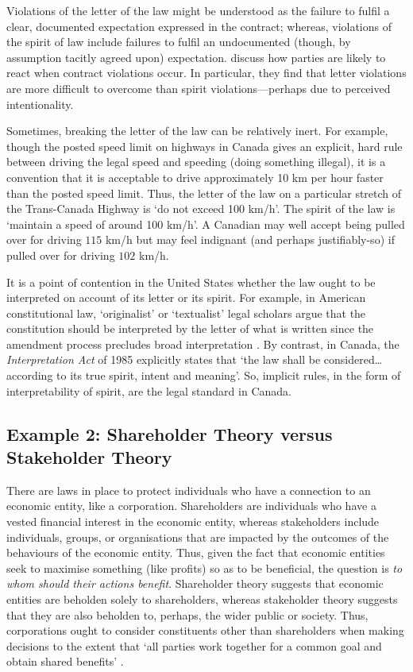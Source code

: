 \documentclass{amsart}
\theoremstyle{indented}
\theoremstyle{indentedProp}
\theoremstyle{indented}
\theoremstyle{indented}
\theoremstyle{indented}
\theoremstyle{indented}
\theoremstyle{indented}
\begin{document}
Violations of the letter of the law might be understood as the failure to fulfil a clear, documented expectation expressed in the contract; whereas, violations of the spirit of law include failures to fulfil an undocumented (though, by assumption tacitly agreed upon) expectation. \citet{Harmon-et-al-2014} discuss how parties are likely to react when contract violations occur. In particular, they find that letter violations are more difficult to overcome than spirit violations---perhaps due to perceived intentionality. 

Sometimes, breaking the letter of the law can be relatively inert. For example, though the posted speed limit on highways in Canada gives an explicit, hard rule between driving the legal speed and speeding (doing something illegal), it is a convention that it is acceptable to drive approximately 10 km per hour faster than the posted speed limit. Thus, the letter of the law on a particular stretch of the Trans-Canada Highway is `do not exceed 100 km/h'. The spirit of the law is `maintain a speed of around 100 km/h'. A Canadian may well accept being pulled over for driving $115$ km/h but may feel indignant (and perhaps justifiably-so) if pulled over for driving $102$ km/h. 

It is a point of contention in the United States whether the law ought to be interpreted on account of its letter or its spirit. For example, in American constitutional law, `originalist' or `textualist' legal scholars argue that the constitution should be interpreted by the letter of what is written since the amendment process precludes broad interpretation \citep{Easterbrook-1989, Taylor-1995}. By contrast, in Canada, the {\it Interpretation Act} of 1985 explicitly states that `the law shall be considered\ldots according to its true spirit, intent and meaning'. So, implicit rules, in the form of interpretability of spirit, are the legal standard in Canada.

\subsection{Example 2: Shareholder Theory versus Stakeholder Theory}
\label{sec:Example3}

There are laws in place to protect individuals who have a connection to an economic entity, like a corporation. Shareholders are individuals who have a vested financial interest in the economic entity, whereas stakeholders include individuals, groups, or organisations that are impacted by the outcomes of the behaviours of the economic entity. Thus, given the fact that economic entities seek to maximise something (like profits) so as to be beneficial, the question is {\it to whom should their actions benefit}. Shareholder theory suggests that economic entities are beholden solely to shareholders, whereas stakeholder theory suggests that they are also beholden to, perhaps, the wider public or society. Thus, corporations ought to consider constituents other than shareholders when making decisions to the extent that `all parties work together for a common goal and obtain shared benefits' \citep[p. 285]{Reynolds-et-al-2006}.
\end{document}
